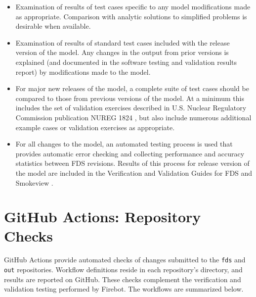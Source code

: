 \documentclass[11pt]{book}
\begin{document}
\begin{itemize}
\item Examination of results of test cases specific to any model modifications made as appropriate.  Comparison with analytic solutions to simplified problems is desirable when available.

\item Examination of results of standard test cases included with the release version of the model. Any changes in the output from prior versions is explained (and documented in the software testing and validation results report) by modifications made to the model.

\item For major new releases of the model, a complete suite of test cases should be compared to those from previous versions of the model.  At a minimum this includes the set of validation exercises described in U.S. Nuclear Regulatory Commission publication NUREG 1824 \cite{NUREG_1824, NUREG_1824_Sup_1}, but also include numerous additional example cases or validation exercises as appropriate.

\item For all changes to the model, an automated testing process is used that provides automatic error checking and collecting performance and accuracy statistics between FDS revisions. Results of this process for release version of the model are included in the Verification and Validation Guides for FDS \cite{FDS_Validation_Guide, FDS_Verification_Guide} and Smokeview \cite{Smokeview_Verification_Guide}.
\end{itemize}


\section{GitHub Actions: Repository Checks}

GitHub Actions provide automated checks of changes submitted to the \texttt{fds} and \texttt{out} repositories. Workflow definitions reside in each repository's  directory, and results are reported on GitHub. These checks complement the verification and validation testing performed by Firebot. The workflows are summarized below.
\end{document}
